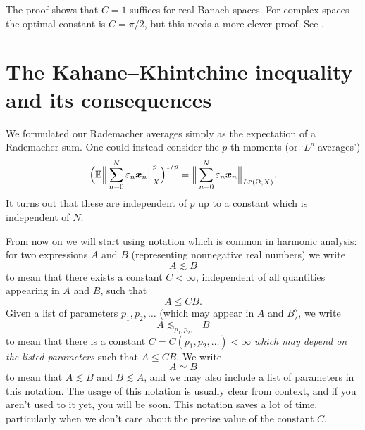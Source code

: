 \begin{rmk}
  The proof shows that $C = 1$ suffices for real Banach spaces.
  For complex spaces the optimal constant is $C = \pi/2$, but this needs a more clever proof.
  See \cite[Proposition 3.2.10]{HNVW16}.
\end{rmk}

\section{The Kahane--Khintchine inequality and its consequences}

We formulated our Rademacher averages simply as the expectation of a Rademacher sum.
One could instead consider the $p$-th moments (or `$L^p$-averages')
\begin{equation*}
  \Big( \mathbb{E} \Big\| \sum_{n=0}^{N} \varepsilon_{n} \bm{x}_{n} \Big\|_{X}^{p} \Big)^{1/p} = \Big\| \sum_{n=0}^{N} \varepsilon_{n} \bm{x}_{n} \Big\|_{L^p(\Omega;X)}.
\end{equation*}
It turns out that these are independent of $p$ up to a constant which is independent of $N$.

\begin{rmk}\label{rmk:HA-notation}
  From now on we will start using notation which is common in harmonic analysis: for two expressions $A$ and $B$ (representing nonnegative real numbers) we write
  \begin{equation*}
    A \lesssim B
  \end{equation*}
  to mean that there exists a constant $C < \infty$, independent of all quantities appearing in $A$ and $B$, such that
  \begin{equation*}
    A \leq CB.
  \end{equation*}
  Given a list of parameters $p_{1}, p_{2}, \ldots$ (which may appear in $A$ and $B$), we write
  \begin{equation*}
    A \lesssim_{p_{1}, p_{2}, \ldots} B
  \end{equation*}
  to mean that there is a constant $C = C(p_{1}, p_{2}, \ldots) < \infty$ \emph{which may depend on the listed parameters} such that $A \leq CB$.
  We write
  \begin{equation*}
    A \simeq B
  \end{equation*}
  to mean that $A \lesssim B$ and $B \lesssim A$, and we may also include a list of parameters in this notation.
  The usage of this notation is usually clear from context, and if you aren't used to it yet, you will be soon.
  This notation saves a lot of time, particularly when we don't care about the precise value of the constant $C$.
\end{rmk}

